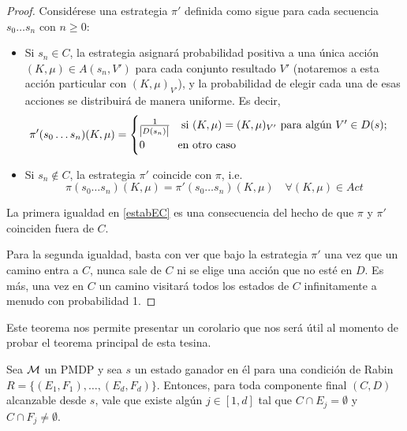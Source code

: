 \begin{proof}
	Considérese una estrategia $\pi'$ definida como sigue para cada secuencia $s_0 \dots s_n$ con $n \geq 0$:

	\begin{itemize}
		\item Si $s_n \in C$, la estrategia asignará probabilidad positiva a una única acción
		      $(K, \mu) \in A(s_n, V')$ para cada conjunto resultado $V'$ (notaremos a esta
		      acción particular con $(K, \mu)_{V'}$), y la probabilidad de elegir cada una de
		      esas acciones se distribuirá de manera uniforme. Es decir,
		      \[
			      \pi'(s_0 \dots s_n)(K, \mu) =
			      \begin{cases}
				      \frac{1}{\abs{D(s_n)}} \quad \text{si } (K, \mu) = (K, \mu)_{V'} \text{ para algún } V' \in D(s); \\
				      0 \qquad \quad \text{en otro caso}
			      \end{cases}
		      \]

		\item Si $s_n \notin C$, la estrategia $\pi'$ coincide con $\pi$, i.e.
		      \[
			      \pi(s_0 \dots s_n)(K, \mu) = \pi'(s_0\dots s_n)(K, \mu) \quad \forall (K, \mu) \in Act
		      \]

	\end{itemize}

	La primera igualdad en \ref{estabEC} es una consecuencia del hecho de que $\pi$
	y $\pi'$ coinciden fuera de $C$.

	Para la segunda igualdad, basta con ver que bajo la estrategia $\pi'$ una vez
	que un camino entra a $C$, nunca sale de $C$ ni se elige una acción que no esté
	en $D$. Es más, una vez en $C$ un camino visitará todos los estados de $C$
	infinitamente a menudo con probabilidad 1.
\end{proof}

Este teorema nos permite presentar un corolario que nos será útil al momento de
probar el teorema principal de esta tesina.

\begin{corollary}
	\label{adaptB30}
	Sea $\mathcal{M}$ un PMDP y sea $s$ un estado ganador en él para una condición de Rabin $R = \{(E_1, F_1), \dots, (E_d, F_d)\}$. %
	Entonces, para toda componente final $(C,D)$ alcanzable desde $s$, vale que existe algún $j \in [1, d]$ tal que $C \cap E_j= \emptyset$ y $C \cap F_j \neq \emptyset$.
\end{corollary}

